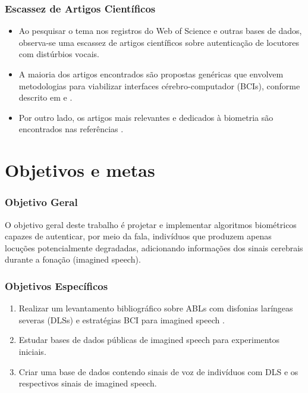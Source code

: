 \documentclass[aspectratio=169]{beamer}
\begin{document}
	\begin{frame}
		\frametitle{Escassez de Artigos Científicos}
		\begin{itemize}
			\item Ao pesquisar o tema nos registros do Web of Science e outras bases de dados, observa-se uma escassez de artigos científicos sobre autenticação de locutores com distúrbios vocais.
			\item A maioria dos artigos encontrados são propostas genéricas que envolvem metodologias para viabilizar interfaces cérebro-computador (BCIs), conforme descrito em \cite{rusnac2021eeg} e \cite{brigham2010imagined}.
			\item Por outro lado, os artigos mais relevantes e dedicados à biometria são encontrados nas referências \cite{moctezuma2019subjects, moctezuma2018eeg, jayarathne2016brainid, jayarathne2017survey, del2014electroencephalogram, ruiz2016cerebre}.
		\end{itemize}
	\end{frame}
	
	\section{Objetivos e metas}
	\begin{frame}
		\frametitle{Objetivo Geral}
		O objetivo geral deste trabalho é projetar e implementar algoritmos biométricos capazes de autenticar, por meio da fala, indivíduos que produzem apenas locuções potencialmente degradadas, adicionando informações dos sinais cerebrais durante a fonação (imagined speech).
	\end{frame}
	
	\begin{frame}
		\frametitle{Objetivos Específicos}
		\begin{enumerate}
			\item Realizar um levantamento bibliográfico sobre ABLs com disfonias laríngeas severas (DLSs) e estratégias BCI para imagined speech \cite{10.1117/12.2255697}.
			\item Estudar bases de dados públicas de imagined speech para experimentos iniciais.
			\item Criar uma base de dados contendo sinais de voz de indivíduos com DLS e os respectivos sinais de imagined speech.
		\end{enumerate}
	\end{frame}
	
\end{document}
